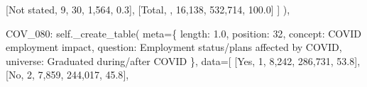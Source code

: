\documentclass[
  11pt,
  a4paper,
]{article}
\newenvironment{Shaded}{\begin{snugshade}}{\end{snugshade}}
\newcommand{\NormalTok}[1]{\textcolor[rgb]{0.00,0.23,0.31}{#1}}
\newcommand{\OperatorTok}[1]{\textcolor[rgb]{0.37,0.37,0.37}{#1}}
\newcommand{\StringTok}[1]{\textcolor[rgb]{0.13,0.47,0.30}{#1}}
\newcommand{\VariableTok}[1]{\textcolor[rgb]{0.07,0.07,0.07}{#1}}
\begin{document}
\begin{Shaded}
\begin{Highlighting}[]
\NormalTok{                [}\StringTok{\textquotesingle{}Not stated\textquotesingle{}}\NormalTok{, }\StringTok{\textquotesingle{}9\textquotesingle{}}\NormalTok{, }\StringTok{\textquotesingle{}30\textquotesingle{}}\NormalTok{, }\StringTok{\textquotesingle{}1,564\textquotesingle{}}\NormalTok{, }\StringTok{\textquotesingle{}0.3\textquotesingle{}}\NormalTok{],}
\NormalTok{                [}\StringTok{\textquotesingle{}Total\textquotesingle{}}\NormalTok{, }\StringTok{\textquotesingle{}\textquotesingle{}}\NormalTok{, }\StringTok{\textquotesingle{}16,138\textquotesingle{}}\NormalTok{, }\StringTok{\textquotesingle{}532,714\textquotesingle{}}\NormalTok{, }\StringTok{\textquotesingle{}100.0\textquotesingle{}}\NormalTok{]}
\NormalTok{                ]}
\NormalTok{            ),}
        
            \StringTok{\textquotesingle{}COV\_080\textquotesingle{}}\NormalTok{: }\VariableTok{self}\NormalTok{.\_create\_table(}
\NormalTok{                meta}\OperatorTok{=}\NormalTok{\{}
                \StringTok{\textquotesingle{}length\textquotesingle{}}\NormalTok{: }\StringTok{\textquotesingle{}1.0\textquotesingle{}}\NormalTok{, }\StringTok{\textquotesingle{}position\textquotesingle{}}\NormalTok{: }\StringTok{\textquotesingle{}32\textquotesingle{}}\NormalTok{,}
                \StringTok{\textquotesingle{}concept\textquotesingle{}}\NormalTok{: }\StringTok{\textquotesingle{}COVID employment impact\textquotesingle{}}\NormalTok{,}
                \StringTok{\textquotesingle{}question\textquotesingle{}}\NormalTok{: }\StringTok{\textquotesingle{}Employment status/plans affected by COVID\textquotesingle{}}\NormalTok{,}
                \StringTok{\textquotesingle{}universe\textquotesingle{}}\NormalTok{: }\StringTok{\textquotesingle{}Graduated during/after COVID\textquotesingle{}}
\NormalTok{                \},}
\NormalTok{                data}\OperatorTok{=}\NormalTok{[}
\NormalTok{                [}\StringTok{\textquotesingle{}Yes\textquotesingle{}}\NormalTok{, }\StringTok{\textquotesingle{}1\textquotesingle{}}\NormalTok{, }\StringTok{\textquotesingle{}8,242\textquotesingle{}}\NormalTok{, }\StringTok{\textquotesingle{}286,731\textquotesingle{}}\NormalTok{, }\StringTok{\textquotesingle{}53.8\textquotesingle{}}\NormalTok{],}
\NormalTok{                [}\StringTok{\textquotesingle{}No\textquotesingle{}}\NormalTok{, }\StringTok{\textquotesingle{}2\textquotesingle{}}\NormalTok{, }\StringTok{\textquotesingle{}7,859\textquotesingle{}}\NormalTok{, }\StringTok{\textquotesingle{}244,017\textquotesingle{}}\NormalTok{, }\StringTok{\textquotesingle{}45.8\textquotesingle{}}\NormalTok{],}

\end{Highlighting}
\end{Shaded}
\end{document}
